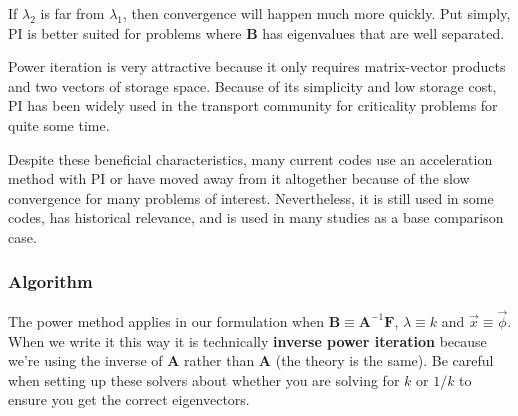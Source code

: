 \documentclass[12pt]{article}
\newcommand{\ve}[1]{\ensuremath{\mathbf{#1}}}
\begin{document}
If $\lambda_2$ is far from $\lambda_1$, then convergence will happen much more quickly. Put simply, PI is better suited for problems where $\ve{B}$ has eigenvalues that are well separated.  

Power iteration is very attractive because it only requires matrix-vector products and two vectors of storage space. Because of its simplicity and low storage cost, PI has been widely used in the transport community for criticality problems for quite some time.

Despite these beneficial characteristics, many current codes use an acceleration method with PI or have moved away from it altogether because of the slow convergence for many problems of interest. Nevertheless, it is still used in some codes, has historical relevance, and is used in many studies as a base comparison case.


\subsubsection*{Algorithm}

The power method applies in our formulation when $\ve{B} \equiv \ve{A}^{-1}\ve{F}$, $\lambda \equiv k$ and $\vec{x} \equiv \vec{\phi}$. 
%
When we write it this way it is technically \textbf{inverse power iteration} because we're using the inverse of $\ve{A}$ rather than $\ve{A}$ (the theory is the same). Be careful when setting up these solvers about whether you are solving for $k$ or $1/k$ to ensure you get the correct eigenvectors.
\end{document}
